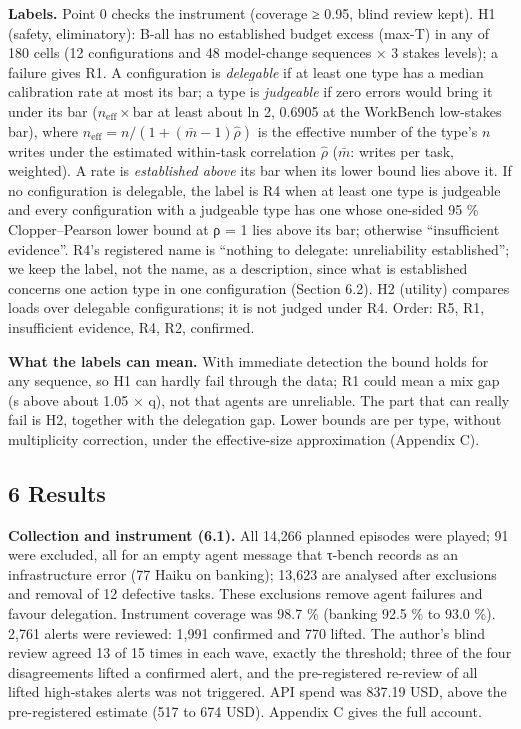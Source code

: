 \textbf{Labels.} Point 0 checks the instrument (coverage ≥ 0.95, blind review kept). H1 (safety, eliminatory): B-all has no established budget excess (max-T) in any of 180 cells (12 configurations and 48 model-change sequences × 3 stakes levels); a failure gives R1. A configuration is \emph{delegable} if at least one type has a median calibration rate at most its bar; a type is \emph{judgeable} if zero errors would bring it under its bar (\(n_{\mathrm{eff}} \times \mathrm{bar}\) at least about ln 2, 0.6905 at the WorkBench low-stakes bar), where \(n_{\mathrm{eff}} = n/(1 + (\bar m - 1)\hat\rho)\) is the effective number of the type's \(n\) writes under the estimated within-task correlation \(\hat\rho\) (\(\bar m\): writes per task, weighted). A rate is \emph{established above} its bar when its lower bound lies above it. If no configuration is delegable, the label is R4 when at least one type is judgeable and every configuration with a judgeable type has one whose one-sided 95 \% Clopper--Pearson lower bound at ρ = 1 lies above its bar; otherwise ``insufficient evidence''. R4's registered name is ``nothing to delegate: unreliability established''; we keep the label, not the name, as a description, since what is established concerns one action type in one configuration (Section 6.2). H2 (utility) compares loads over delegable configurations; it is not judged under R4. Order: R5, R1, insufficient evidence, R4, R2, confirmed.

\textbf{What the labels can mean.} With immediate detection the bound holds for any sequence, so H1 can hardly fail through the data; R1 could mean a mix gap (s above about 1.05 × q), not that agents are unreliable. The part that can really fail is H2, together with the delegation gap. Lower bounds are per type, without multiplicity correction, under the effective-size approximation (Appendix C).

\subsection{6 Results}\label{results}

\textbf{Collection and instrument (6.1).} All 14,266 planned episodes were played; 91 were excluded, all for an empty agent message that τ-bench records as an infrastructure error (77 Haiku on banking); 13,623 are analysed after exclusions and removal of 12 defective tasks. These exclusions remove agent failures and favour delegation. Instrument coverage was 98.7 \% (banking 92.5 \% to 93.0 \%). 2,761 alerts were reviewed: 1,991 confirmed and 770 lifted. The author's blind review agreed 13 of 15 times in each wave, exactly the threshold; three of the four disagreements lifted a confirmed alert, and the pre-registered re-review of all lifted high-stakes alerts was not triggered. API spend was 837.19 USD, above the pre-registered estimate (517 to 674 USD). Appendix C gives the full account.

